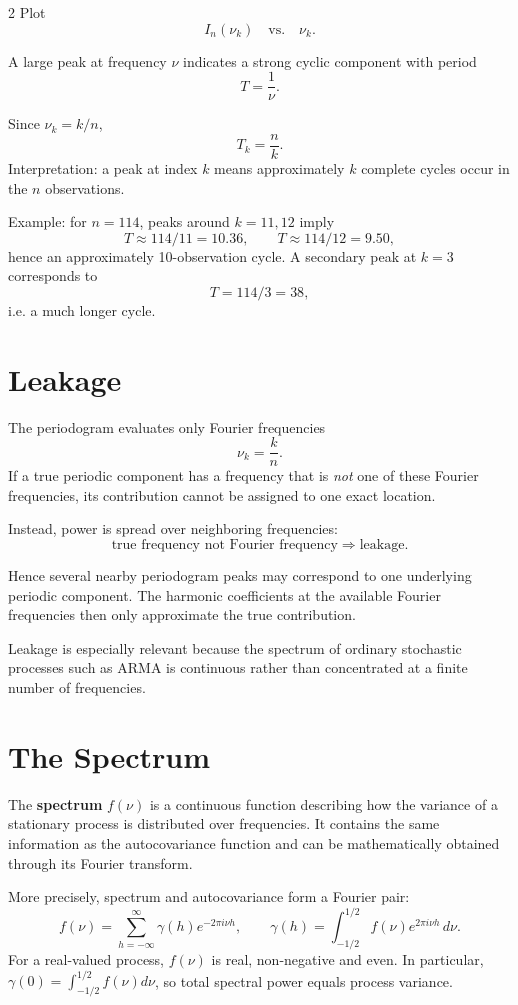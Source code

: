 \documentclass[9pt,a4paper]{extarticle}
\newcommand{\key}[1]{\textbf{#1}}
\begin{document}
\begin{multicols}{2}
Plot
\[
I_n(\nu_k)\quad\text{vs.}\quad\nu_k.
\]

A large peak at frequency \(\nu\) indicates a strong cyclic component with period
\[
\boxed{T=\frac1\nu}.
\]

Since \(\nu_k=k/n\),
\[
\boxed{T_k=\frac nk}.
\]
Interpretation: a peak at index \(k\) means approximately \(k\) complete cycles occur in the \(n\) observations.

Example: for \(n=114\), peaks around \(k=11,12\) imply
\[
T\approx114/11=10.36,\qquad
T\approx114/12=9.50,
\]
hence an approximately 10-observation cycle. A secondary peak at \(k=3\) corresponds to
\[
T=114/3=38,
\]
i.e. a much longer cycle.

\section{Leakage}

The periodogram evaluates only Fourier frequencies
\[
\nu_k=\frac{k}{n}.
\]
If a true periodic component has a frequency that is \emph{not} one of these Fourier frequencies, its contribution cannot be assigned to one exact location.

Instead, power is spread over neighboring frequencies:
\[
\boxed{\text{true frequency not Fourier frequency}\Rightarrow\text{leakage}.}
\]

Hence several nearby periodogram peaks may correspond to one underlying periodic component. The harmonic coefficients at the available Fourier frequencies then only approximate the true contribution.

Leakage is especially relevant because the spectrum of ordinary stochastic processes such as ARMA is continuous rather than concentrated at a finite number of frequencies.

\section{The Spectrum}

The \key{spectrum} \(f(\nu)\) is a continuous function describing how the variance of a stationary process is distributed over frequencies. It contains the same information as the autocovariance function and can be mathematically obtained through its Fourier transform.

More precisely, spectrum and autocovariance form a Fourier pair:
\[
\boxed{f(\nu)=\sum_{h=-\infty}^{\infty}\gamma(h)e^{-2\pi i\nu h},\qquad
\gamma(h)=\int_{-1/2}^{1/2}f(\nu)e^{2\pi i\nu h}\,d\nu.}
\]
For a real-valued process, \(f(\nu)\) is real, non-negative and even. In particular, \(\gamma(0)=\int_{-1/2}^{1/2}f(\nu)d\nu\), so total spectral power equals process variance.


\end{multicols}
\end{document}
